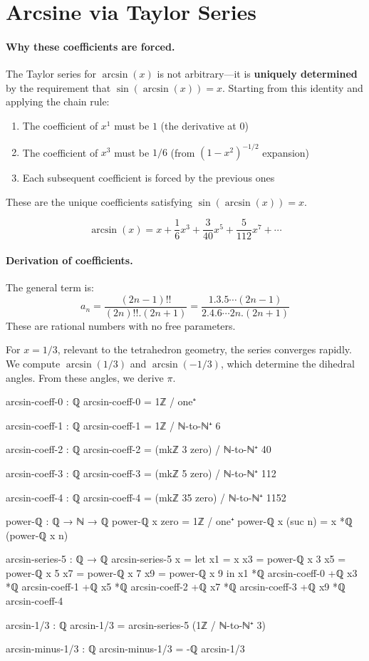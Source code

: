 \documentclass[11pt,a4paper]{book}
\def\cdot{.}%
\begin{document}
\section{Arcsine via Taylor Series}

\paragraph{Why these coefficients are forced.}

The Taylor series for $\arcsin(x)$ is not arbitrary—it is \textbf{uniquely determined} by 
the requirement that $\sin(\arcsin(x)) = x$. Starting from this identity and applying the 
chain rule:
\begin{enumerate}
\item The coefficient of $x^1$ must be $1$ (the derivative at 0)
\item The coefficient of $x^3$ must be $1/6$ (from $(1-x^2)^{-1/2}$ expansion)
\item Each subsequent coefficient is forced by the previous ones
\end{enumerate}

These are the unique coefficients satisfying $\sin(\arcsin(x)) = x$.

\[
\arcsin(x) = x + \frac{1}{6}x^3 + \frac{3}{40}x^5 + \frac{5}{112}x^7 + \cdots
\]

\paragraph{Derivation of coefficients.}
The general term is:
\[
a_n = \frac{(2n-1)!!}{(2n)!! \cdot (2n+1)} = \frac{1 \cdot 3 \cdot 5 \cdots (2n-1)}{2 \cdot 4 \cdot 6 \cdots 2n \cdot (2n+1)}
\]
These are rational numbers with no free parameters.

For $x = 1/3$, relevant to the tetrahedron geometry, the series converges rapidly. We compute $\arcsin(1/3)$ and $\arcsin(-1/3)$, which determine the dihedral angles. From these angles, we derive $\pi$.

\begin{code}
arcsin-coeff-0 : ℚ
arcsin-coeff-0 = 1ℤ / one⁺

arcsin-coeff-1 : ℚ  
arcsin-coeff-1 = 1ℤ / ℕ-to-ℕ⁺ 6

arcsin-coeff-2 : ℚ
arcsin-coeff-2 = (mkℤ 3 zero) / ℕ-to-ℕ⁺ 40

arcsin-coeff-3 : ℚ
arcsin-coeff-3 = (mkℤ 5 zero) / ℕ-to-ℕ⁺ 112

arcsin-coeff-4 : ℚ
arcsin-coeff-4 = (mkℤ 35 zero) / ℕ-to-ℕ⁺ 1152

power-ℚ : ℚ → ℕ → ℚ
power-ℚ x zero = 1ℤ / one⁺
power-ℚ x (suc n) = x *ℚ (power-ℚ x n)

arcsin-series-5 : ℚ → ℚ
arcsin-series-5 x = 
  let x1 = x
      x3 = power-ℚ x 3
      x5 = power-ℚ x 5
      x7 = power-ℚ x 7
      x9 = power-ℚ x 9
  in x1 *ℚ arcsin-coeff-0
   +ℚ x3 *ℚ arcsin-coeff-1
   +ℚ x5 *ℚ arcsin-coeff-2
   +ℚ x7 *ℚ arcsin-coeff-3
   +ℚ x9 *ℚ arcsin-coeff-4

arcsin-1/3 : ℚ
arcsin-1/3 = arcsin-series-5 (1ℤ / ℕ-to-ℕ⁺ 3)

arcsin-minus-1/3 : ℚ
arcsin-minus-1/3 = -ℚ arcsin-1/3
\end{code}
\end{document}
